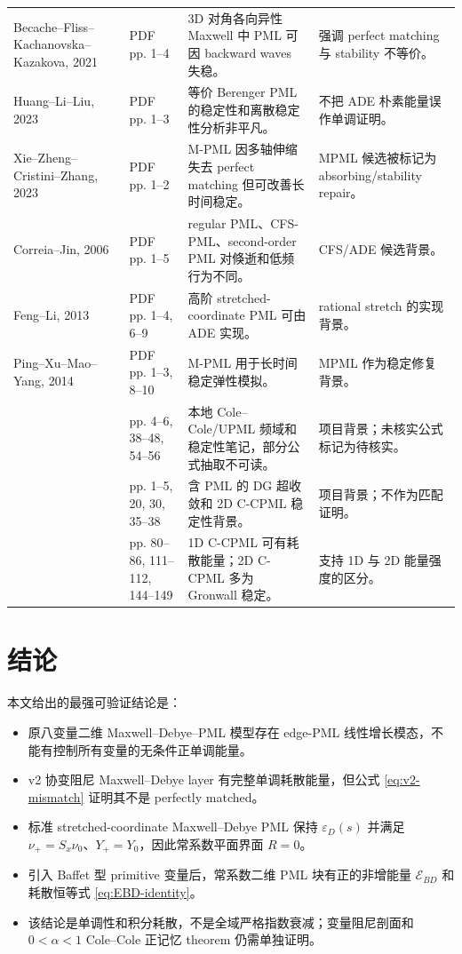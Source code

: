 \documentclass[UTF8,a4paper,11pt]{ctexart}
\newcommand{\Ecal}{\mathcal E}
\begin{document}
{\begin{longtable}{L{0.20\textwidth}L{0.14\textwidth}L{0.29\textwidth}L{0.22\textwidth}}
Becache--Fliss--Kachanovska--Kazakova, 2021
& PDF pp. 1--4
& 3D 对角各向异性 Maxwell 中 PML 可因 backward waves 失稳。
& 强调 perfect matching 与 stability 不等价。 \\
Huang--Li--Liu, 2023
& PDF pp. 1--3
& 等价 Berenger PML 的稳定性和离散稳定性分析非平凡。
& 不把 ADE 朴素能量误作单调证明。 \\
Xie--Zheng--Cristini--Zhang, 2023
& PDF pp. 1--2
& M-PML 因多轴伸缩失去 perfect matching 但可改善长时间稳定。
& MPML 候选被标记为 absorbing/stability repair。 \\
Correia--Jin, 2006
& PDF pp. 1--5
& regular PML、CFS-PML、second-order PML 对倏逝和低频行为不同。
& CFS/ADE 候选背景。 \\
Feng--Li, 2013
& PDF pp. 1--4, 6--9
& 高阶 stretched-coordinate PML 可由 ADE 实现。
& rational stretch 的实现背景。 \\
Ping--Xu--Mao--Yang, 2014
& PDF pp. 1--3, 8--10
& M-PML 用于长时间稳定弹性模拟。
& MPML 作为稳定修复背景。 \\
& pp. 4--6, 38--48, 54--56
& 本地 Cole--Cole/UPML 频域和稳定性笔记，部分公式抽取不可读。
& 项目背景；未核实公式标记为待核实。 \\
& pp. 1--5, 20, 30, 35--38
& 含 PML 的 DG 超收敛和 2D C-CPML 稳定性背景。
& 项目背景；不作为匹配证明。 \\
& pp. 80--86, 111--112, 144--149
& 1D C-CPML 可有耗散能量；2D C-CPML 多为 Gronwall 稳定。
& 支持 1D 与 2D 能量强度的区分。 \\
\bottomrule
\end{longtable}
}

\section{结论}

本文给出的最强可验证结论是：

\begin{itemize}
\item 原八变量二维 Maxwell--Debye--PML 模型存在 edge-PML 线性增长模态，不能有控制所有变量的无条件正单调能量。
\item v2 协变阻尼 Maxwell--Debye layer 有完整单调耗散能量，但公式 \eqref{eq:v2-mismatch} 证明其不是 perfectly matched。
\item 标准 stretched-coordinate Maxwell--Debye PML 保持 \(\varepsilon_D(s)\) 并满足
\(\nu_+=S_x\nu_0\)、\(Y_+=Y_0\)，因此常系数平面界面 \(R=0\)。
\item 引入 Baffet 型 primitive 变量后，常系数二维 PML 块有正的非增能量
\(\Ecal_{BD}\) 和耗散恒等式 \eqref{eq:EBD-identity}。
\item 该结论是单调性和积分耗散，不是全域严格指数衰减；变量阻尼剖面和
\(0<\alpha<1\) Cole--Cole 正记忆 theorem 仍需单独证明。
\end{itemize}
\end{document}
